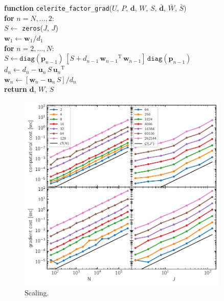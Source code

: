 \documentclass[rnaas]{aastex62}
\newcommand{\figurelabel}[1]{\label{fig:#1}}
\newcommand{\T}{\ensuremath{\mathrm{T}}}
\newcommand{\bvec}[1]{{\ensuremath{\boldsymbol{#1}}}}
\begin{document}
\medskip
\begin{minipage}{\linewidth}
\textbf{function} \texttt{celerite\_factor\_grad}($U$, $P$, $\bvec{d}$, $W$,
    $S$, $\bar{\bvec{d}}$, $\bar{W}$, $\bar{S}$) \\
\hspace*{2em}\textbf{for} $n = N,\ldots,2$:\\

\hspace*{2em}$S \gets$ \texttt{zeros}($J$, $J$) \\
    \hspace*{2em}$\bvec{w}_1 \gets \bvec{w}_1 / d_{1}$ \\
\hspace*{2em}\textbf{for} $n = 2,\ldots,N$:\\
\hspace*{2em}\hspace*{2em}$S \gets \texttt{diag}(\bvec{p}_{n-1})\,[
    S + d_{n-1}\,{\bvec{w}_{n-1}}^\T\,{\bvec{w}_{n-1}}
]\,\texttt{diag}(\bvec{p}_{n-1})$ \\
\hspace*{2em}\hspace*{2em}$d_{n} \gets d_{n} - \bvec{u}_n\,S\,{\bvec{u}_n}^\T$\\
\hspace*{2em}\hspace*{2em}$\bvec{w}_n \gets \left[\bvec{w}_n -
    \bvec{u}_n\,S \right] / d_{n}$\\
    \hspace*{2em}\textbf{return} $\bvec{d}$, $W$, $S$
\end{minipage}
\medskip


\begin{figure}[h!]
\begin{center}
\includegraphics[width=0.9\textwidth]{figure.pdf}
\caption{%
    Scaling.
\figurelabel{figure}}
\end{center}
\end{figure}



\end{document}

